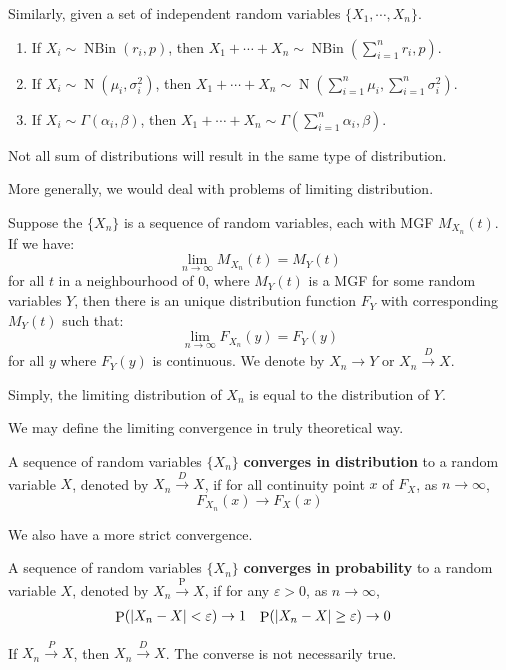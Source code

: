 \documentclass{huhtakm-template-book-v2}
\DeclareMathOperator{\prob}{P}
\DeclareMathOperator{\N}{N}
\DeclareMathOperator{\NBin}{NBin}
\begin{document}
\newpage
\begin{eg}
	Similarly, given a set of independent random variables $\{X_{1},\cdots,X_{n}\}$.
	\begin{enumerate}
		\item If $X_{i}\sim\NBin(r_{i},p)$, then $X_{1}+\cdots+X_{n}\sim\NBin(\sum_{i=1}^{n}r_{i},p)$.
		\item If $X_{i}\sim\N(\mu_{i},\sigma_{i}^{2})$, then $X_{1}+\cdots+X_{n}\sim\N(\sum_{i=1}^{n}\mu_{i},\sum_{i=1}^{n}\sigma_{i}^{2})$.
		\item If $X_{i}\sim\Gamma(\alpha_{i},\beta)$, then $X_{1}+\cdots+X_{n}\sim\Gamma(\sum_{i=1}^{n}\alpha_{i},\beta)$.
	\end{enumerate}
\end{eg}
\begin{rem}
	Not all sum of distributions will result in the same type of distribution.
\end{rem}
More generally, we would deal with problems of limiting distribution.
\begin{thm}
	Suppose the $\{X_{n}\}$ is a sequence of random variables, each with MGF $M_{X_{n}}(t)$. If we have:
	\begin{equation*}
		\lim_{n\to\infty}M_{X_{n}}(t)=M_{Y}(t)
	\end{equation*}
	for all $t$ in a neighbourhood of $0$, where $M_{Y}(t)$ is a MGF for some random variables $Y$, then there is an unique distribution function $F_{Y}$ with corresponding $M_{Y}(t)$ such that:
	\begin{equation*}
		\lim_{n\to\infty}F_{X_{n}}(y)=F_{Y}(y)
	\end{equation*}
	for all $y$ where $F_{Y}(y)$ is continuous. We denote by $X_{n}\to Y$ or $X_{n}\xrightarrow{D}X$.
\end{thm}
\begin{rem}
	Simply, the limiting distribution of $X_{n}$ is equal to the distribution of $Y$.
\end{rem}
We may define the limiting convergence in truly theoretical way.
\begin{defn}
	A sequence of random variables $\{X_{n}\}$ \textbf{converges in distribution} to a random variable $X$, denoted by $X_{n}\xrightarrow{D}X$, if for all continuity point $x$ of $F_{X}$, as $n\to\infty$,
	\begin{equation*}
		F_{X_{n}}(x)\to F_{X}(x)
	\end{equation*}
\end{defn}
We also have a more strict convergence.
\begin{defn}
	A sequence of random variables $\{X_{n}\}$ \textbf{converges in probability} to a random variable $X$, denoted by $X_{n}\xrightarrow{\prob}X$, if for any $\varepsilon>0$, as $n\to\infty$,
	\begin{align*}
		\prob(\abs{X_{n}-X}<\varepsilon)&\to 1 & \prob(\abs{X_{n}-X}\geq\varepsilon)&\to 0
	\end{align*}
\end{defn}
\begin{rem}
	If $X_{n}\xrightarrow{P}X$, then $X_{n}\xrightarrow{D}X$. The converse is not necessarily true.
\end{rem}
\end{document}
